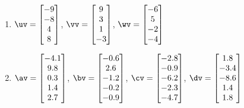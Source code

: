 \begin{exercise}
\begin{enumerate}
\item \(\uv=\begin{bmatrix}-9\\-8\\4\\8\end{bmatrix}\), \(\vv=\begin{bmatrix}9\\3\\1\\-3\end{bmatrix}\), \(\wv=\begin{bmatrix}-6\\5\\-2\\-4\end{bmatrix}\)
\setbox\ajrqrbox\hbox{}%
\marginpar{\usebox{\ajrqrbox\\[2ex]}}%

\item \(\av=\begin{bmatrix}-4.1\\9.8\\0.3\\1.4\\2.7\end{bmatrix}\), \(\bv=\begin{bmatrix}-0.6\\2.6\\-1.2\\-0.2\\-0.9\end{bmatrix}\), \(\cv=\begin{bmatrix}-2.8\\-0.9\\-6.2\\-2.3\\-4.7\end{bmatrix}\), \(\dv=\begin{bmatrix}1.8\\-3.4\\-8.6\\1.4\\1.8\end{bmatrix}\)
\setbox\ajrqrbox\hbox{}%
\marginpar{\usebox{\ajrqrbox\\[2ex]}}%



\end{enumerate}
\end{exercise}
